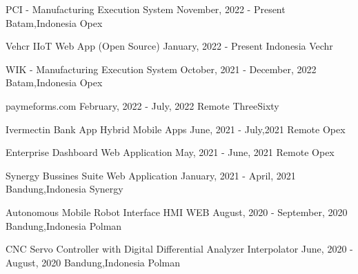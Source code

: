 
\begin{cvhonors}

  \cvhonor
    {PCI - Manufacturing Execution System} %
    {November, 2022 - Present} %
    {Batam,Indonesia} %
    {Opex} %

  \cvhonor
    {Vehcr IIoT Web App (Open Source)} %
    {January, 2022 - Present} %
    {Indonesia} %
    {Vechr} %

  \cvhonor
    {WIK - Manufacturing Execution System} %
    {October, 2021 - December, 2022} %
    {Batam,Indonesia} %
    {Opex} %

  \cvhonor
    {paymeforms.com} %
    {February, 2022 - July, 2022} %
    {Remote} %
    {ThreeSixty} %

  \cvhonor
    {Ivermectin Bank App Hybrid Mobile Apps} %
    {June, 2021 - July,2021} %
    {Remote} %
    {Opex} %

  \cvhonor
    {Enterprise Dashboard Web Application} %
    {May, 2021 - June, 2021} %
    {Remote} %
    {Opex} %
    
  \cvhonor
    {Synergy Bussines Suite Web Application} %
    {January, 2021 - April, 2021} %
    {Bandung,Indonesia} %
    {Synergy} %

  \cvhonor
    {Autonomous Mobile Robot Interface HMI WEB} %
    {August, 2020 - September, 2020} %
    {Bandung,Indonesia} %
    {Polman} %

  \cvhonor
    {CNC Servo Controller with Digital Differential Analyzer Interpolator} %
    {June, 2020 - August, 2020} %
    {Bandung,Indonesia} %
    {Polman} %


\end{cvhonors}
